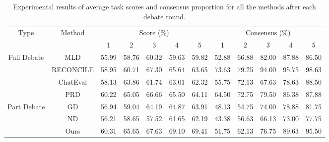 \begin{table}
\small
  \centering
\setlength{\tabcolsep}{6.5pt}
  \renewcommand{\arraystretch}{1.2}
\begin{tabular}{c|c|ccccc|ccccc}
\toprule
\multirow{2}{*}{Type}    & \multirow{2}{*}{Method} & \multicolumn{5}{c|}{Score (\%)}     & \multicolumn{5}{c}{Consensus (\%)}    \\ \cmidrule{3-12} 
                    &    & 1     & 2     & 3     & 4     & 5     & 1     & 2     & 3     & 4     & 5     \\ \midrule
\multirow{4}{*}{Full Debate}   & MLD                     & 55.99 & 58.76 & 60.32 & 59.63 & 59.82 & 52.88 & 66.88 & 82.00 & 87.88 & 86.50 \\
& RECONCILE               & 58.95 & 60.71 & 67.30 & 65.64 & 63.65 & 73.63 & 79.25 & 94.00 & 95.75 & 98.63 \\
& ChatEval                 & 58.13 & 63.86 & 61.74 & 63.01 & 62.32 & 55.75 & 72.13 & 67.63 & 78.63 & 88.50 \\
& PRD                      & 60.22 & 65.05 & 66.66 & 65.50 & 64.11 & 64.50 & 72.75 & 79.50 & 86.38 & 87.88 \\  \midrule
\multirow{3}{*}{Part Debate}   & GD                       & 56.94 & 59.04 & 64.19 & 64.87 & 63.91 & 48.13 & 54.75 & 74.00 & 78.88 & 81.75 \\
& ND                       & 56.21 & 58.65 & 57.52 & 61.65 & 62.19 & 43.38 & 56.63 & 66.13 & 73.00 & 77.75 \\  \cmidrule{2-12}
& Ours                    & 60.31 & 65.65 & 67.63 & 69.10 & 69.41 & 51.75 & 62.13 & 76.75 & 89.63 & 95.50 \\ \bottomrule
\end{tabular}
  \caption{\label{appendix_round_acc_con}
   Experimental results of average task scores and consensus proportion for all the methods after each debate round.
  }
\end{table}